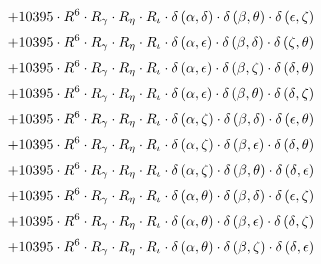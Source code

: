 \begin{subequations}
\begin{gather}
 \\[0.2em] \notag 		 + 10395 \cdot R^{6} \cdot R_{\gamma{}} \cdot R_{\eta{}} \cdot R_{\iota{}} \cdot \delta{}\left(\alpha{}, \delta{}\right) \cdot \delta{}\left(\beta{}, \theta{}\right) \cdot \delta{}\left(\epsilon{}, \zeta{}\right) 
 \\[0.2em] \notag 		 + 10395 \cdot R^{6} \cdot R_{\gamma{}} \cdot R_{\eta{}} \cdot R_{\iota{}} \cdot \delta{}\left(\alpha{}, \epsilon{}\right) \cdot \delta{}\left(\beta{}, \delta{}\right) \cdot \delta{}\left(\zeta{}, \theta{}\right) 
 \\[0.2em] \notag 		 + 10395 \cdot R^{6} \cdot R_{\gamma{}} \cdot R_{\eta{}} \cdot R_{\iota{}} \cdot \delta{}\left(\alpha{}, \epsilon{}\right) \cdot \delta{}\left(\beta{}, \zeta{}\right) \cdot \delta{}\left(\delta{}, \theta{}\right) 
 \\[0.2em] \notag 		 + 10395 \cdot R^{6} \cdot R_{\gamma{}} \cdot R_{\eta{}} \cdot R_{\iota{}} \cdot \delta{}\left(\alpha{}, \epsilon{}\right) \cdot \delta{}\left(\beta{}, \theta{}\right) \cdot \delta{}\left(\delta{}, \zeta{}\right) 
 \\[0.2em] \notag 		 + 10395 \cdot R^{6} \cdot R_{\gamma{}} \cdot R_{\eta{}} \cdot R_{\iota{}} \cdot \delta{}\left(\alpha{}, \zeta{}\right) \cdot \delta{}\left(\beta{}, \delta{}\right) \cdot \delta{}\left(\epsilon{}, \theta{}\right) 
 \\[0.2em] \notag 		 + 10395 \cdot R^{6} \cdot R_{\gamma{}} \cdot R_{\eta{}} \cdot R_{\iota{}} \cdot \delta{}\left(\alpha{}, \zeta{}\right) \cdot \delta{}\left(\beta{}, \epsilon{}\right) \cdot \delta{}\left(\delta{}, \theta{}\right) 
 \\[0.2em] \notag 		 + 10395 \cdot R^{6} \cdot R_{\gamma{}} \cdot R_{\eta{}} \cdot R_{\iota{}} \cdot \delta{}\left(\alpha{}, \zeta{}\right) \cdot \delta{}\left(\beta{}, \theta{}\right) \cdot \delta{}\left(\delta{}, \epsilon{}\right) 
 \\[0.2em] \notag 		 + 10395 \cdot R^{6} \cdot R_{\gamma{}} \cdot R_{\eta{}} \cdot R_{\iota{}} \cdot \delta{}\left(\alpha{}, \theta{}\right) \cdot \delta{}\left(\beta{}, \delta{}\right) \cdot \delta{}\left(\epsilon{}, \zeta{}\right) 
 \\[0.2em] \notag 		 + 10395 \cdot R^{6} \cdot R_{\gamma{}} \cdot R_{\eta{}} \cdot R_{\iota{}} \cdot \delta{}\left(\alpha{}, \theta{}\right) \cdot \delta{}\left(\beta{}, \epsilon{}\right) \cdot \delta{}\left(\delta{}, \zeta{}\right) 
 \\[0.2em] \notag 		 + 10395 \cdot R^{6} \cdot R_{\gamma{}} \cdot R_{\eta{}} \cdot R_{\iota{}} \cdot \delta{}\left(\alpha{}, \theta{}\right) \cdot \delta{}\left(\beta{}, \zeta{}\right) \cdot \delta{}\left(\delta{}, \epsilon{}\right) 

\end{gather}
\end{subequations}
